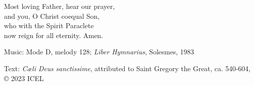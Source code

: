 \hymn



\begin{underhymnverse}
Most loving Father, hear our prayer,\\
and you, O Christ coequal Son,\\
who with the Spirit Paraclete\\
now reign for all eternity. Amen.
\end{underhymnverse}

\begin{hymnsource}
Music: Mode D, melody 128; \emph{Liber Hymnarius}, Solesmes, 1983

Text: \emph{Cæli Deus sanctissime}, attributed to Saint Gregory the Great, ca. 540-604, © 2023 ICEL
\end{hymnsource}
